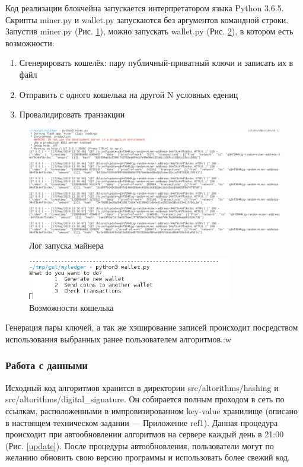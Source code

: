 Код реализации блокчейна запускается интерпретатором языка Python 3.6.5.
Скрипты {\small miner.py} и {\small wallet.py} запускаются без аргументов
командной строки. Запустив {\small miner.py} (Рис. \ref{miner_run}), можно запускать {\small
wallet.py} (Рис. \ref{wallet_run}), в котором есть возможности:
\begin{enumerate}
    \item Сгенерировать кошелёк: пару публичный-приватный ключи и записать их в файл
    \item Отправить с одного кошелька на другой N условных едениц
    \item Провалидировать транзакции
\end{enumerate}

\begin{figure}[h]
    \centering
    \includegraphics[width=\textwidth]{images/miner_run}
    \caption{Лог запуска майнера}\label{miner_run}
\end{figure}

\begin{figure}[h]
    \centering
    \includegraphics[width=0.8\textwidth]{images/wallet_run}
    \caption{Возможности кошелька}\label{wallet_run}
\end{figure}

Генерация пары ключей, а так же хэширование записей происходит посредством
использования выбранных ранее пользователем алгоритмов.:w

\subsubsection{Работа с данными}\label{autoonova}
Исходный код алгоритмов хранится в директории {\small src/altorithms/hashing} и
{\small src/altorithms/digital\_signature}. Он собирается полным проходом в
сеть по ссылкам, расположенными в импровизированном key-value хранилище
(описано в настоящем техническом задании --- Приложение ref1). Данная процедура
происходит при автообновлении алгоритмов на сервере каждый день в 21:00
(Рис. \ref{update}). После процедуры автообновления, пользователи могут по
желанию обновить свою версию программы и использовать более свежий код.

